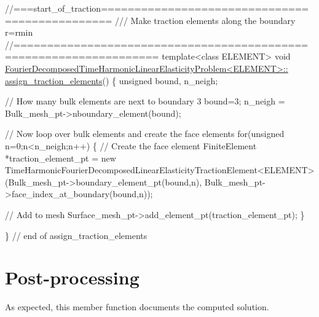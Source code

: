 \begin{DoxyCodeInclude}
\textcolor{comment}{//===start\_of\_traction===============================================}
\textcolor{comment}{/// Make traction elements along the boundary r=rmin}
\textcolor{comment}{}\textcolor{comment}{//===================================================================}
\textcolor{keyword}{template}<\textcolor{keyword}{class} ELEMENT>
\textcolor{keywordtype}{void} \hyperlink{classFourierDecomposedTimeHarmonicLinearElasticityProblem_ab995077cbd92377b726d0ea0de81720e}{FourierDecomposedTimeHarmonicLinearElasticityProblem<ELEMENT>::}
\hyperlink{classFourierDecomposedTimeHarmonicLinearElasticityProblem_ab995077cbd92377b726d0ea0de81720e}{assign\_traction\_elements}()
\{
 \textcolor{keywordtype}{unsigned} bound, n\_neigh;

 \textcolor{comment}{// How many bulk elements are next to boundary 3}
 bound=3;
 n\_neigh = Bulk\_mesh\_pt->nboundary\_element(bound); 

 \textcolor{comment}{// Now loop over bulk elements and create the face elements}
 \textcolor{keywordflow}{for}(\textcolor{keywordtype}{unsigned} n=0;n<n\_neigh;n++)
  \{
   \textcolor{comment}{// Create the face element}
   FiniteElement *traction\_element\_pt 
    = \textcolor{keyword}{new} TimeHarmonicFourierDecomposedLinearElasticityTractionElement<ELEMENT>
    (Bulk\_mesh\_pt->boundary\_element\_pt(bound,n),
     Bulk\_mesh\_pt->face\_index\_at\_boundary(bound,n));
 
   \textcolor{comment}{// Add to mesh}
   Surface\_mesh\_pt->add\_element\_pt(traction\_element\_pt);
  \}

\} \textcolor{comment}{// end of assign\_traction\_elements}

\end{DoxyCodeInclude}




 

\hypertarget{index_doc}{}\section{Post-\/processing}\label{index_doc}
As expected, this member function documents the computed solution.


